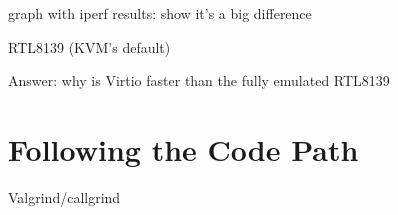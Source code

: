 \documentclass[11pt,pdftex,twocolumn]{article}
\begin{document}
graph with iperf results: show it's a big difference

RTL8139 (KVM's default)

Answer: why is Virtio faster than the fully emulated RTL8139

\section{Following the Code Path}
Valgrind/callgrind

%
%
%
%
%

{\footnotesize 
}
\end{document}
